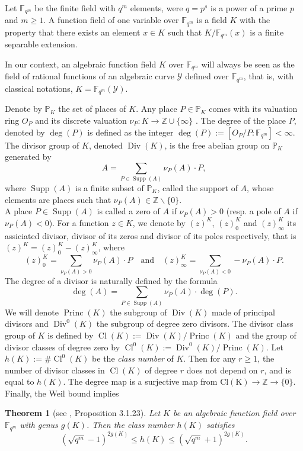 \documentclass[10pt]{article}
\newtheorem{thm}{Theorem}
\theoremstyle{definition}
\theoremstyle{definition}
\theoremstyle{definition}
\newcommand{\s}{\vspace{0.3cm}}
\newcommand{\cd}{\cdot}
\newcommand{\Z}{\mathbb{Z}}
\newcommand{\PP}{\mathbb{P}}
\newcommand{\fqm}{\mathbb{F}_{q^m}}
\newcommand{\Y}{\mathcal{Y}}
\newcommand{\Div}{\operatorname{Div}}
\newcommand{\Princ}{\operatorname{Princ}}
\newcommand{\Cl}{\operatorname{Cl}}
\newcommand{\Supp}{\operatorname{Supp}}
\begin{document}
\s


Let $\fqm$ be the finite field with $q^m$ elements, were $q=p^s$ is a power of a prime $p$ and $m \geq 1$. A function field of one variable over $\fqm$ is a field $K$ with the property that there exists an element $x\in K$ such that $K/\fqm(x)$ is a finite separable extension. 

In our context, an algebraic function field $K$ over $\fqm$ will always be seen as the field of rational functions of an algebraic curve $\Y$ defined over $\fqm$, that is, with classical notations, $K = \fqm(\Y)$.

Denote by $\PP_K$ the set of places of $K$. Any place $P \in \PP_K$ comes with its valuation ring $O_P$ and its discrete valuation $\nu_P : K \rightarrow \Z \cup \{\infty\}$ . The degree of the place $P$, denoted by $\deg(P)$ is defined as the  integer $\deg(P) :=  [O_P/P:\fqm] < \infty$.
The divisor group of $K$, denoted $\Div(K)$, is the free abelian group on $\mathbb{P}_K$ generated by 
\[A = \sum\limits_{P \in \Supp(A)} \nu_P(A) \cd P,\]
where $\Supp(A)$ is a finite subset of $\PP_K$, called the support of $A$, whose elements are places such that $\nu_{P}(A) \in \Z \backslash \{0\}$. \\ A place  $P \in \Supp(A)$ is called a zero of $A$ if $\nu_P(A) >0$ (resp. a pole of $A$ if $\nu_P(A) < 0$). For a function $z \in K$, we denote by $(z)^K$, $(z)^K_0$ and $(z)^K_{\infty}$ its assiciated divisor, divisor of its zeros and divisor of its poles respectively, that is $(z)^K = (z)^K_0 - (z)^K_{\infty}$, where 
\[(z)^K_0 = \sum\limits_{\nu_P(A) > 0}\nu_P(A) \cd P \quad \textrm{and}  \quad (z)^K_{\infty} = \sum\limits_{\nu_P(A) < 0}-\nu_P(A) \cd P.\]
The degree of a divisor is naturally defined by the formula
\[\deg(A) = \sum\limits_{P \in \Supp(A)} \nu_P(A) \cd \deg( P).\]
\s
We will denote $\Princ(K)$ the subgroup of $\Div(K)$ made of principal divisors and $\Div^0(K)$ the subgroup of degree zero divisors. The divisor class group of $K$ is defined by $\Cl(K):=\Div(K)/\Princ(K)$ and the group of divisor classes of degree zero by $\Cl^0(K):=\Div^0(K)/\Princ(K)$. 
Let $h(K):= \# \Cl^0(K)$ be the \emph{class number} of $K$. Then for any $r \geq 1$, the number of divisor classes in $\Cl(K)$ of degree $r$ does not depend on $r$, and is equal to $h(K)$. The degree map is a surjective map from $\mathrm{Cl(K)} \rightarrow \Z \rightarrow \{0\}$. Finally, the Weil bound implies

\s

\begin{thm}[see \cite{Tsf}, Proposition 3.1.23]\label{esti h(X)}
Let $K$ be an algebraic function field over $\fqm$ with genus $g(K)$. Then the class number $h(K)$ satisfies
\[ (\sqrt{q^m}-1)^{2g(K)} \leq h(K) \leq (\sqrt{q^m}+1)^{2g(K)}.\]
\end{thm}
\s
\end{document}
